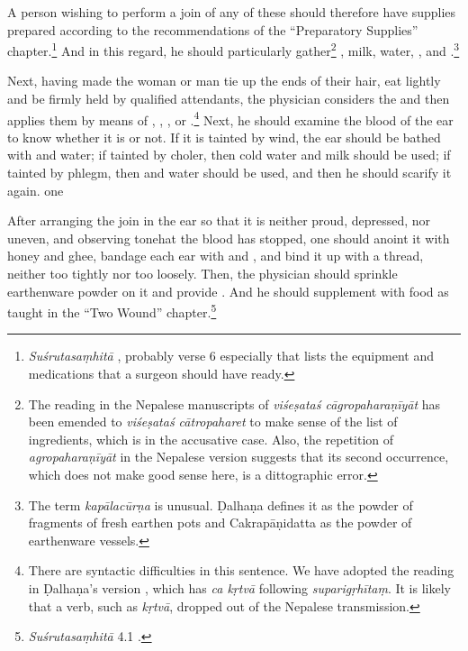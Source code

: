 \begin{translation}
    A person wishing to perform a join of any of these should therefore 
    have supplies prepared 
    according to the recommendations of the “Preparatory
    Supplies” chapter.\footnote{\emph{Suśrutasaṃhitā} , probably verse 6 
    especially that lists the equipment 
    and medications that a surgeon should have ready.}  And in this regard, he 
    should particularly gather\footnote{The reading in the Nepalese manuscripts of 
    \emph{viśeṣataś cāgropaharaṇīyāt} has been emended to \emph{viśeṣataś 
    cātropaharet} to make sense of the list of ingredients, which is in the 
    accusative case. Also, the repetition of \emph{agropaharaṇīyāt} in the 
    Nepalese version suggests that its second occurrence, which does not make 
    good sense here, is a dittographic error.} , 
    milk, water,
    , and .\footnote{The term \emph{kapālacūrṇa} is unusual. Ḍalhaṇa \citep[79]{vulgate} defines it as the powder of fragments of fresh earthen pots and Cakrapāṇidatta \citep[129]{acar-1939} as the powder of earthenware vessels.}  
    
    Next, having made the woman or man tie up the ends of their hair, eat lightly
and be firmly held by qualified attendants, the physician considers the
 and then applies them by means of ,
, , or
.\footnote{There are syntactic difficulties in this
    sentence.  We have %
    adopted the reading in Ḍalhaṇa's version \citep[78]{vulgate}, which has \emph{ca
    kṛtvā} following \emph{suparigṛhītaṃ}. It is likely that a verb, such as
    \emph{kṛtvā}, dropped out of the Nepalese transmission.}  Next, he should examine
    the blood of the ear to know whether it is  or not. If it is
    tainted by wind, the ear should be bathed with  and water; if tainted by choler, then cold water and milk should be
    used; if tainted by phlegm, then  and water should
    be used, and then he should scarify it again.
    one
    
After arranging the join in the ear so that it is neither proud, depressed, nor
uneven, and observing tonehat the blood has stopped, one should anoint it with
honey and ghee, bandage each ear with  and , and
bind it up with a thread, neither too tightly nor too loosely.  Then, the
physician should sprinkle earthenware powder on it and  provide
. And he should supplement with food as taught in  the
“Two Wound” chapter.\footnote{\emph{Suśrutasaṃhitā} 4.1 \citep[396–408]{vulgate}.}
    

\end{translation}
